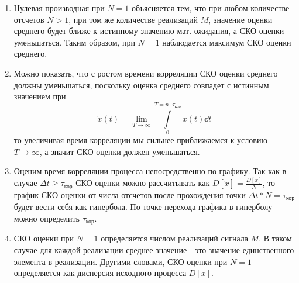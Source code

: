 \documentclass[a4paper,14pt]{extarticle}
\begin{document}
\begin{enumerate}
	\item Нулевая производная при $N=1$ объясняется тем, что при любом количестве отсчетов $N>1$, при том же
	количестве реализаций $M$, значение оценки среднего будет ближе к истинному значению мат. ожидания, а СКО оценки - уменьшаться. Таким
	образом, при $N=1$ наблюдается максимум СКО оценки среднего.
    \item Можно показать, что с ростом времени корреляции СКО оценки среднего должны уменьшаться, поскольку оценка среднего совпадет с истинным значением при
        \begin{equation}
            \label{eq:}
            \tilde x(t) = \lim_{T \to \infty} \int\limits_{0}^{T = n\cdot \tau_{\text{кор}}}  x(t) \dd{t}
		\end{equation}
		то увеличивая время корреляции мы сильнее приближаемся к условию $T \to \infty$, а значит СКО оценки должен уменьшаться.
	\item Оценим время корреляции процесса непосредственно по графику. Так как в случае $\Delta t \ge \tau_\text{кор}$ СКО
	оценки можно рассчитывать как $D[\tilde{x}] = \frac{D[x]}{N}$, то график СКО оценки от числа отсчетов после
	прохождения точки $\Delta t * N = \tau_\text{кор}$ будет вести себя как гипербола. По точке перехода графика в гиперболу
	можно определить $\tau_\text{кор}$.
	\item СКО оценки при $N=1$ определяется числом реализаций сигнала $M$. В таком случае для каждой
	реализации среднее значение - это значение единственного элемента в реализации. Другими словами, СКО оценки при
	$N=1$ определяется как дисперсия исходного процесса $D[x]$.
\end{enumerate}
\end{document}
